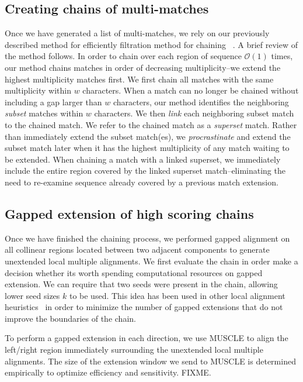 \documentclass{ws-procs9x6}
\begin{document}
\subsection{Creating chains of multi-matches}

Once we have generated a list of multi-matches, we rely on our previously described method for efficiently filtration method for chaining ~\cite{ref-procrast}. A brief review of the method follows. In order to chain over each region of sequence $\mathcal{O}(1)$ times,
our method chains matches in order of decreasing multiplicity--we
extend the highest multiplicity matches first. We first chain all matches
with the same multiplicity within $w$
characters. When a match can no
longer be chained without including a gap larger than $w$
characters, our method identifies the neighboring \textit{subset}
matches within $w$ characters. We then \textit{link} each
neighboring subset match to the chained match. We refer to the
chained match as a \textit{superset} match. Rather than immediately
extend the subset match(es), we \textit{procrastinate} and extend
the subset match later when it has the highest multiplicity of any
match waiting to be extended. When chaining a match with a linked
superset, we immediately include the entire region covered by the linked superset
match--eliminating the need to re-examine sequence already covered by
a previous match extension.

\subsection{Gapped extension of high scoring chains}

Once we have finished the chaining process, we performed gapped alignment on all collinear regions located between two adjacent components to generate unextended local multiple alignments. We first evaluate the chain in order make a decision whether its worth spending computational resources on gapped extension. We can require that two seeds were present in the chain, allowing lower seed sizes $k$ to be used. This idea has been used in other local alignment heuristics~\cite{ref-blastz,ref-gappedblast,ref-blat} in order to minimize the number of gapped extensions that do not improve the boundaries of the chain.

To perform a gapped extension in each direction, we use MUSCLE to align the left/right region immediately surrounding the unextended local multiple alignments. The size of the extension window we send to MUSCLE is determined empirically to optimize efficiency and sensitivity. FIXME.
\end{document}
